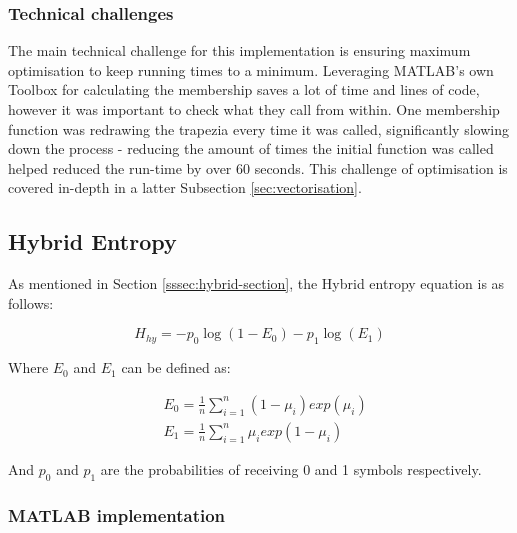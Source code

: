\subsubsection{Technical challenges}

The main technical challenge for this implementation is ensuring maximum optimisation to keep running times to a minimum. Leveraging MATLAB's own Toolbox for calculating the membership saves a lot of time and lines of code, however it was important to check what they call from within. One membership function was redrawing the trapezia every time it was called, significantly slowing down the process - reducing the amount of times the initial function was called helped reduced the run-time by over 60 seconds. This challenge of optimisation is covered in-depth in a latter Subsection \ref{sec:vectorisation}.

\newpage
\subsection{Hybrid Entropy}
\label{ssec:hybrid-sec}

As mentioned in Section \ref{sssec:hybrid-section}, the Hybrid entropy equation is as follows:

\begin{equation}
  H_{hy} = -p_0\log(1 - E_0) - p_1\log(E_1)
\end{equation}

Where $E_0$ and $E_1$ can be defined as:

\begin{subequations} %
  \begin{align}
    &E_0 = \frac{1}{n}\displaystyle\sum_{i=1}^{n}{(1-\mu_i)exp(\mu_i)} \\
    &E_1 = \frac{1}{n}\displaystyle\sum_{i=1}^{n}{\mu_iexp(1-\mu_i)}
  \end{align}
\end{subequations}

And $p_0$ and $p_1$ are the probabilities of receiving 0 and 1 symbols respectively.

\subsubsection{MATLAB implementation}

